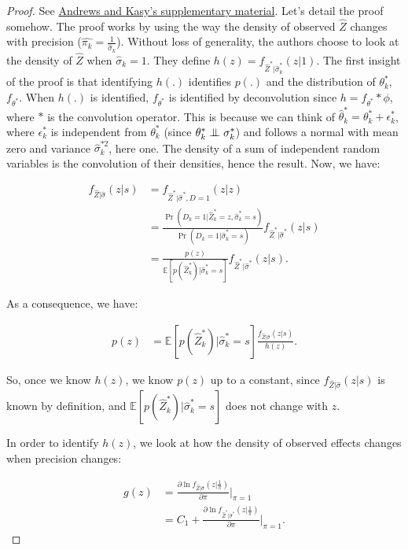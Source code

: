 \documentclass[
]{book}
\newcommand{\esp}[1]{\mathbb{E}[ #1 ]}
\newcommand\Ind{\protect\mathpalette{\protect\independenT}{\perp}}
\def\independenT#1#2{\mathrel{\setbox0\hbox{$#1#2$}\copy0\kern-\wd0\mkern4mu\box0}}
\newcommand{\partder}[2]{\frac{\partial #1}{\partial #2}}
\theoremstyle{definition}
\theoremstyle{definition}
\theoremstyle{definition}
\theoremstyle{definition}
\theoremstyle{remark}
\begin{document}
\begin{proof}
\iffalse{} {Proof. } \fi{}See \href{https://www.aeaweb.org/content/file?id=10286}{Andrews and Kasy's supplementary material}.
Let's detail the proof somehow.
The proof works by using the way the density of observed \(\hat{Z}\) changes with precision (\(\hat{\pi_k}=\frac{1}{\hat{\sigma}_k}\)).
Without loss of generality, the authors choose to look at the density of \(\hat{Z}\) when \(\hat{\sigma}_k=1\).
They define \(h(z)=f_{\hat{Z}^*|\hat{\sigma}^*_k}(z|1)\).
The first insight of the proof is that identifying \(h(.)\) identifies \(p(.)\) and the distribution of \(\theta^*_k\), \(f_{\theta^*}\).
When \(h(.)\) is identified, \(f_{\theta^*}\) is identified by deconvolution since \(h=f_{\theta^*}*\phi\), where \(*\) is the convolution operator.
This is because we can think of \(\hat{\theta}^*_k=\theta^*_k+\epsilon^*_k\), where \(\epsilon^*_k\) is independent from \(\theta^*_k\) (since \(\theta^*_k\Ind\sigma^*_k\)) and follows a normal with mean zero and variance \(\hat{\sigma}^{*2}_k\), here one.
The density of a sum of independent random variables is the convolution of their densities, hence the result.
Now, we have:

\begin{align*}
  f_{\hat{Z}|\hat{\sigma}}(z|s) & = f_{\hat{Z}^*|\hat{\sigma}^*,D=1}(z|z)\\
                           & = \frac{\Pr(D_k=1|\hat{Z}_k^*=z,\hat{\sigma}^*_k=s)}{\Pr(D_k=1|\hat{\sigma}_k^*=s)}f_{\hat{Z}^*|\hat{\sigma}^*}(z|s)\\
                           & = \frac{p(z)}{\esp{p(\hat{Z}^*_k)|\hat{\sigma}^*_k=s}}f_{\hat{Z}^*|\hat{\sigma}^*}(z|s).
\end{align*}

As a consequence, we have:

\begin{align*}
  p(z)& = \esp{p(\hat{Z}^*_k)|\hat{\sigma}_k^*=s}\frac{f_{\hat{Z}|\hat{\sigma}}(z|s)}{h(z)}.
\end{align*}

So, once we know \(h(z)\), we know \(p(z)\) up to a constant, since \(f_{\hat{Z}|\hat{\sigma}}(z|s)\) is known by definition, and \(\esp{p(\hat{Z}^*_k)|\hat{\sigma}_k^*=s}\) does not change with \(z\).

In order to identify \(h(z)\), we look at how the density of observed effects changes when precision changes:

\begin{align*}
  g(z) & = \partder{\ln f_{\hat{Z}|\hat{\sigma}}(z|\frac{1}{\pi})}{\pi}|_{\pi=1}\\
      & = C_1 + \partder{\ln f_{\hat{Z}^*|\hat{\sigma}^*}(z|\frac{1}{\pi})}{\pi}|_{\pi=1}.
\end{align*}


\end{proof}
\end{document}
